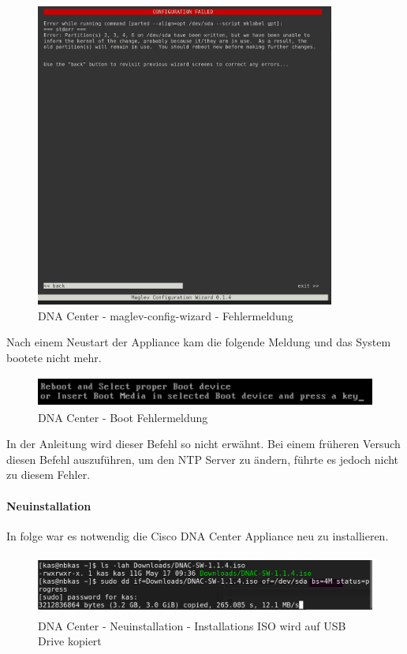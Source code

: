 \begin{figure}[H]
	\centering
	\includegraphics[height=10cm]{img/dna-center-reset-fail-1.png}
	\caption{DNA Center - maglev-config-wizard - Fehlermeldung}
	\label{fig:dna-center-reset-1}
\end{figure}

Nach einem Neustart der Appliance kam die folgende Meldung und das System bootete nicht mehr. 
\begin{figure}[H]
	\centering
	\includegraphics[height=1cm]{img/dna-center-reset-fail-2.png}
	\caption{DNA Center - Boot Fehlermeldung}
	\label{fig:dna-center-reset-2}
\end{figure}

In der Anleitung wird dieser Befehl so nicht erwähnt. Bei einem früheren Versuch diesen Befehl auszuführen, um den NTP Server zu ändern, führte es jedoch nicht zu diesem Fehler. 

\paragraph{Neuinstallation}
In folge war es notwendig die Cisco DNA Center Appliance neu zu installieren. 

\begin{figure}[H]
	\centering
	\includegraphics[height=2cm]{img/dna-center-reset-iso.png}
	\caption{DNA Center - Neuinstallation - Installations ISO wird auf USB Drive kopiert}
	\label{fig:dna-center-iso-1}
\end{figure}

